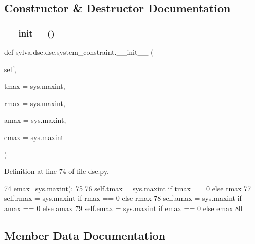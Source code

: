 \subsection{Constructor \& Destructor Documentation}
\mbox{\label{classsylva_1_1dse_1_1dse_1_1system__constraint_a523ed20f50972074b7ac58f0512e6a44}} 
\subsubsection{\texorpdfstring{\+\_\+\+\_\+init\+\_\+\+\_\+()}{\_\_init\_\_()}}
{\footnotesize\ttfamily def sylva.\+dse.\+dse.\+system\+\_\+constraint.\+\_\+\+\_\+init\+\_\+\+\_\+ (\begin{DoxyParamCaption}\item[{}]{self,  }\item[{}]{tmax = {\ttfamily sys.maxint},  }\item[{}]{rmax = {\ttfamily sys.maxint},  }\item[{}]{amax = {\ttfamily sys.maxint},  }\item[{}]{emax = {\ttfamily sys.maxint} }\end{DoxyParamCaption})}



Definition at line 74 of file dse.\+py.


\begin{DoxyCode}
74                  emax=sys.maxint):
75 
76         self.tmax = sys.maxint \textcolor{keywordflow}{if} tmax == 0 \textcolor{keywordflow}{else} tmax
77         self.rmax = sys.maxint \textcolor{keywordflow}{if} rmax == 0 \textcolor{keywordflow}{else} rmax
78         self.amax = sys.maxint \textcolor{keywordflow}{if} amax == 0 \textcolor{keywordflow}{else} amax
79         self.emax = sys.maxint \textcolor{keywordflow}{if} emax == 0 \textcolor{keywordflow}{else} emax
80 
\end{DoxyCode}


\subsection{Member Data Documentation}
\mbox{\label{classsylva_1_1dse_1_1dse_1_1system__constraint_a37c94dd85a091ca20492e0fdffde4d52}} 

